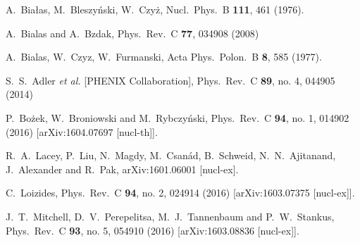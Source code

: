 \documentclass[a4paper,12pt]{article}
\begin{document}
\begin{thebibliography}{9}
  A.~Białas, M.~Bleszyński, W.~Czyż,
  Nucl.\ Phys.\ B {\bf 111}, 461 (1976).

  A.~Bialas and A.~Bzdak,
  Phys.\ Rev.\ C {\bf 77}, 034908 (2008)

  A.~Bialas, W.~Czyz, W.~Furmanski,
  Acta Phys.\ Polon.\ B {\bf 8}, 585 (1977).

  S.~S.~Adler {\it et al.} [PHENIX Collaboration],
  Phys.\ Rev.\ C {\bf 89}, no. 4, 044905 (2014)

 P.~Bożek, W.~Broniowski and M.~Rybczyński,
  Phys.\ Rev.\ C {\bf 94}, no. 1, 014902 (2016)
  [arXiv:1604.07697 [nucl-th]].

 R.~A.~Lacey, P.~Liu, N.~Magdy, M.~Csanád, B.~Schweid, N.~N.~Ajitanand, J.~Alexander and R.~Pak,
  arXiv:1601.06001 [nucl-ex].

 C.~Loizides,
  Phys.\ Rev.\ C {\bf 94}, no. 2, 024914 (2016)
  [arXiv:1603.07375 [nucl-ex]].

 J.~T.~Mitchell, D.~V.~Perepelitsa, M.~J.~Tannenbaum and P.~W.~Stankus,
  Phys.\ Rev.\ C {\bf 93}, no. 5, 054910 (2016)
  [arXiv:1603.08836 [nucl-ex]].


\end{thebibliography}
\end{document}
